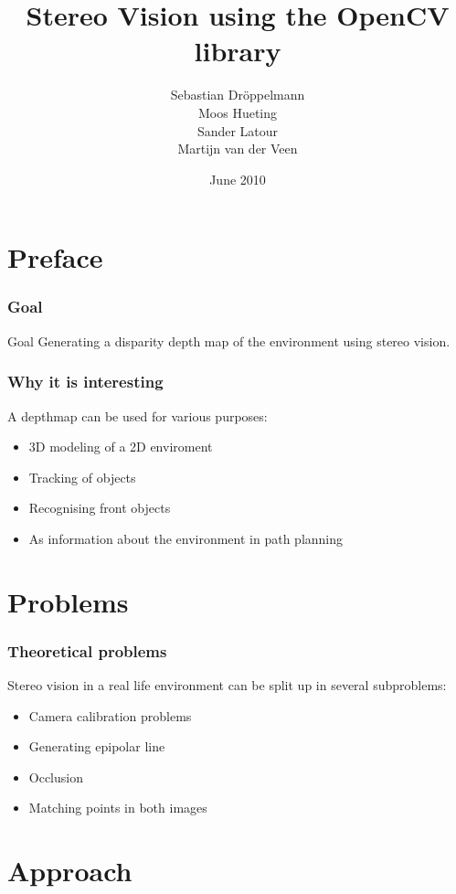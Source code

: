 
%
%

\title[Stereo vision]{Stereo Vision using the OpenCV library}
\author[Dr\"oppelmann \and Hueting \and Latour \and \\Van der Veen]{Sebastian Dr\"oppelmann \\ Moos Hueting \\ Sander Latour \\ Martijn van der Veen}
\date{June 2010}
\subject{Computer vision}



  \titlepage

\section{Preface}


 \frametitle{Goal}
 \begin{block}{Goal}
   Generating a disparity depth map of the environment using stereo vision.
 \end{block}

 \frametitle{Why it is interesting}
   A depthmap can be used for various purposes:
   \begin{itemize}
    \item 3D modeling of a 2D enviroment
    \item Tracking of objects
    \item Recognising front objects
    \item As information about the environment in path planning
   \end{itemize}


\section{Problems}

 \frametitle{Theoretical problems}
   Stereo vision in a real life environment can be split up in several subproblems:
   \begin{itemize}
    \item Camera calibration problems
    \item Generating epipolar line
    \item Occlusion
    \item Matching points in both images
   \end{itemize}

\section{Approach}

